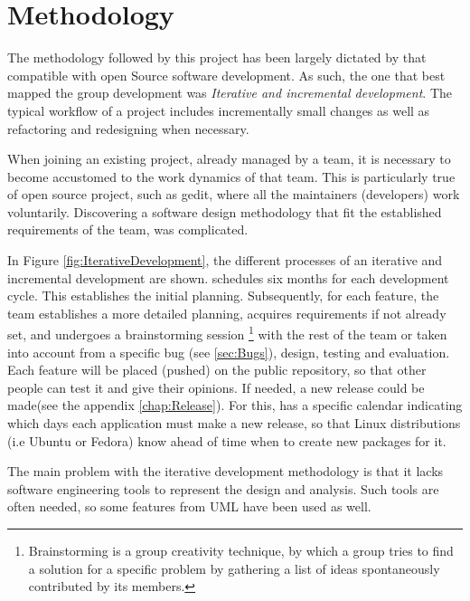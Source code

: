 \section{Methodology}\label{sec:Methodology}

The methodology followed by this project has been largely dictated by that compatible 
with open Source software development.    As such, the one that best mapped the group 
development was  \emph{Iterative and incremental development}.
The typical workflow of a  \GNOME project includes incrementally small changes 
as well as refactoring and redesigning when necessary.

When joining an existing project, already managed by a team, it is necessary to become accustomed 
to the work dynamics of that team. This is particularly true of open source project, such as gedit, 
where all the maintainers (developers) work voluntarily.  Discovering a software design methodology 
that fit the established requirements of the team, was complicated.



In Figure \ref{fig:IterativeDevelopment}, the different processes of an iterative and incremental 
development are shown.  \GNOME schedules six months for each development cycle. This establishes the initial planning. 
Subsequently, for each feature, the team establishes a more detailed planning, acquires requirements if not already set, 
and undergoes a brainstorming session \footnote{Brainstorming is a group creativity technique, by which a group tries to find a 
solution for a specific problem by gathering a list of ideas spontaneously contributed by its members.} with the 
rest of the team or taken into account from a specific bug (see \ref{sec:Bugs}), design, testing and evaluation. 
Each feature will be placed (pushed) on the public repository,  so that other people can test it and give their opinions. 
If needed, a new release could be made(see the appendix \ref{chap:Release}).  For this, \GNOME has a specific calendar indicating 
which days each application must make a new release, so that Linux distributions (i.e Ubuntu or Fedora) 
know ahead of time when to create new packages for it.

The main problem with the iterative development methodology is that it lacks software engineering tools 
to represent the design and analysis.  Such tools are often needed, so some features from UML have been used as well.





